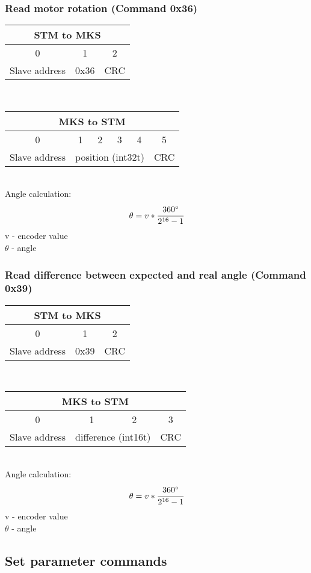 \documentclass[]{article}
\begin{document}
	\subsubsection*{Read motor rotation (Command 0x36)}
	\begin{tabular}{|c|c|c|}
		\hline
		\multicolumn{3}{|c|}{STM to MKS} \\ \hline
		0 & 1 & 2 \\ \hline
		Slave address & 0x36 & CRC \\ \hline		
	\end{tabular} 
	\\
	\begin{tabular}{|c|c|c|c|c|c|}
		\hline
		\multicolumn{6}{|c|}{MKS to STM} \\ \hline
		0 & 1 & 2 & 3 & 4 & 5  \\ \hline
		Slave address & \multicolumn{4}{|c|}{position (int32t)} & CRC \\ \hline
	\end{tabular}\\
	Angle calculation:
	$$\theta = v*\cfrac{360^\circ}{2^{16}-1}$$
	v - encoder value \\
	$\theta$ - angle \\
	\subsubsection*{Read difference between expected and real angle (Command 0x39)}
	\begin{tabular}{|c|c|c|}
		\hline
		\multicolumn{3}{|c|}{STM to MKS} \\ \hline
		0 & 1 & 2 \\ \hline
		Slave address & 0x39 & CRC \\ \hline		
	\end{tabular} 
	\\
	\begin{tabular}{|c|c|c|c|}
		\hline
		\multicolumn{4}{|c|}{MKS to STM} \\ \hline
		0 & 1 & 2 & 3  \\ \hline
		Slave address & \multicolumn{2}{|c|}{difference (int16t)} & CRC \\ \hline
	\end{tabular}\\
	Angle calculation:
	$$\theta = v*\cfrac{360^\circ}{2^{16}-1}$$
	v - encoder value \\
	$\theta$ - angle \\
	\subsection{Set parameter commands}
\end{document}
